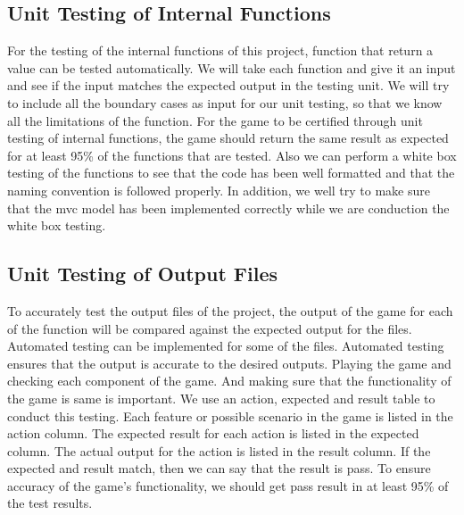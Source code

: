 \documentclass[12pt,letterpaper]{article}
\begin{document}
	\subsection{Unit Testing of Internal Functions}
	 For the testing of the internal functions of this project, function that return a value can be tested automatically. We will take each function and give it an input and see if the input matches the expected output in the testing unit. We will try to include all the boundary cases as input for our unit testing, so that we know all the limitations of the function. For the game to be certified through unit testing of internal functions, the game should return the same result as expected for at least 95\% of the functions that are tested. Also we can perform a white box testing of the functions to see that the code has been well formatted and that the naming convention is followed properly. In addition, we well try to make sure that the mvc model has been implemented correctly while we are conduction the white box testing.
	\subsection{Unit Testing of Output Files}
	To accurately test the output files of the project, the output of the game for each of the function will be compared against the expected output for the files. Automated testing can be implemented for some of the files. Automated testing ensures that the output is accurate to the desired outputs. Playing the game and checking each component of the game. And making sure that the functionality of the game is same is important. We use an action, expected and result table to conduct this testing. Each feature or possible scenario in the game is listed in the action column. The expected result for each action is listed in the expected column. The actual output for the action is listed in the result column. If the expected and result match, then we can say that the result is pass. To ensure accuracy of the game’s functionality, we should get pass result in at least 95\% of the test results.
\end{document}
